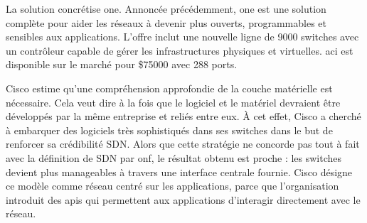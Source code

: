 La solution concrétise \gls{one}. Annoncée précédemment, \gls{one} est une solution complète pour aider les réseaux à devenir plus ouverts, programmables et sensibles aux applications. L'offre inclut une nouvelle ligne de 9000 switches avec un contrôleur capable de gérer les infrastructures physiques et virtuelles. \gls{aci} est disponible sur le marché pour \$75000 avec 288 ports. \cite{CiscoInsiemeLast}




Cisco estime qu'une compréhension approfondie de la couche matérielle est nécessaire. Cela veut dire à la fois que le logiciel et le matériel devraient être développés par la même entreprise et reliés entre eux. À cet effet, Cisco a cherché à embarquer des logiciels très sophistiqués dans ses switches dans le but de renforcer sa crédibilité SDN.
Alors que cette stratégie ne concorde pas tout à fait avec la définition de SDN par \gls{onf}, le résultat obtenu est proche : les switches devient plus manageables à travers une interface centrale fournie. Cisco désigne ce modèle comme réseau centré sur les applications, parce que l'organisation introduit des \glspl{api} qui permettent aux applications d'interagir directement avec le réseau. \cite{CiscoSDNONE}




